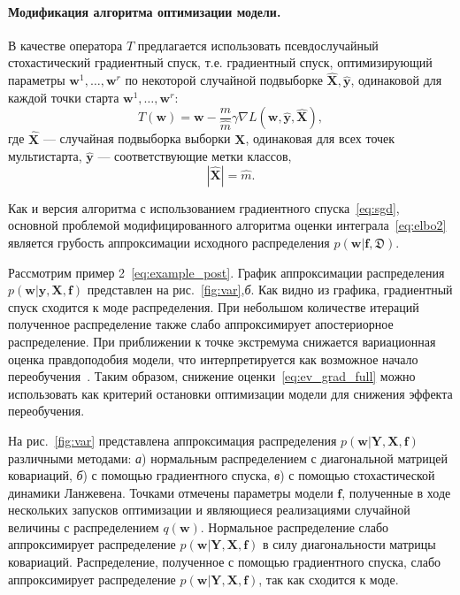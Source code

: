 \documentclass[12pt]{a&t}
\begin{document}

\paragraph{Модификация алгоритма оптимизации модели.} 
В качестве оператора $T$ предлагается использовать псевдослучайный стохастический градиентный спуск, т.е. градиентный спуск, оптимизирующий параметры $\mathbf{w}^1,\dots,\mathbf{w}^r$ по некоторой случайной подвыборке $\hat{\mathbf{X}}, \hat{\mathbf{y}}$, одинаковой для каждой точки старта $\mathbf{w}^1,\dots,\mathbf{w}^r$:
\begin{equation}
    \label{eq:sgd}
	T(\mathbf{w}) = \mathbf{w} -  \frac{m}{\hat{m}} \gamma \nabla L(\mathbf{w}, \hat{\mathbf{y}}, \hat{\mathbf{X}}),	
\end{equation}
где $\hat{\mathbf{X}}$ --- случайная подвыборка выборки ${\mathbf{X}}$, одинаковая для всех точек мультистарта, $\hat{\mathbf{y}}$ --- соответствующие метки классов, $$|\hat{\mathbf{X}}| = \hat{m}.$$

Как и версия алгоритма с использованием градиентного спуска~\eqref{eq:sgd}, основной проблемой модифицированного алгоритма оценки интеграла~\eqref{eq:elbo2} является грубость аппроксимации исходного распределения $p(\mathbf{w}|\mathbf{f},\mathfrak{D})$.

Рассмотрим пример 2~\eqref{eq:example_post}.
График аппроксимации распределения $p(\mathbf{w}|\mathbf{y}, \mathbf{X}, \mathbf{f})$ представлен на рис.~\ref{fig:var},\textit{б}.
Как видно из графика, градиентный спуск сходится к моде распределения. При небольшом количестве итераций полученное распределение также слабо аппроксимирует апостериорное распределение. {При приближении к точке экстремума снижается вариационная оценка правдоподобия модели, что  интерпретируется как возможное начало переобучения~\cite{early}. Таким образом, снижение оценки~\eqref{eq:ev_grad_full} можно использовать как критерий остановки оптимизации модели для снижения эффекта переобучения.  }

На рис.~\ref{fig:var} представлена  {аппроксимация распределения $p(\mathbf{w}|\mathbf{Y}, \mathbf{X}, \mathbf{f})$ различными методами: \textit{а}) нормальным распределением с диагональной матрицей ковариаций, \textit{б}) с помощью градиентного спуска, \textit{в}) с помощью стохастической динамики Ланжевена. Точками отмечены параметры модели $\mathbf{f}$, полученные в ходе нескольких запусков оптимизации и являющиеся реализациями случайной величины с распределением $q(\mathbf{w})$. Нормальное распределение слабо аппроксимирует распределение $p(\mathbf{w}|\mathbf{Y}, \mathbf{X}, \mathbf{f})$ в силу диагональности матрицы ковариаций. Распределение, полученное с помощью градиентного спуска, слабо аппроксимирует распределение $p(\mathbf{w}|\mathbf{Y}, \mathbf{X}, \mathbf{f})$, так как сходится к моде.}
\end{document}
